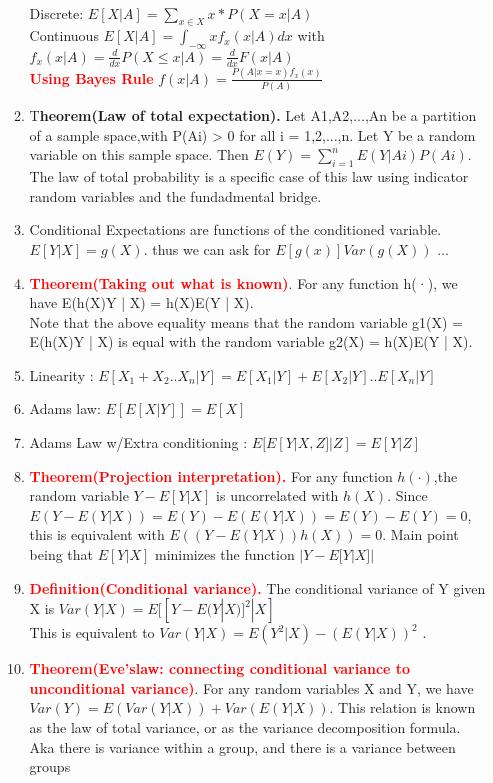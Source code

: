 \documentclass[11pt]{article}
\begin{document}
\begin{enumerate}
\begin{enumerate}
	\\
	Discrete: $E[X|A] = \sum_{x\in X} x*P(X=x|A)$\\
	Continuous $E[X|A] = \int_{-\infty}xf_x(x|A)dx$ with $f_x(x|A) = \frac{d}{dx} P(X\le x|A) = \frac{d}{dx} F(x|A)$
	\\
	\textcolor{red}{\textbf{Using Bayes Rule}}
	$f(x|A) = \frac{P(A|x=x)f_x(x)}{P(A)}$
	\item T\textbf{heorem(Law of total expectation). }Let A1,A2,...,An be a partition of a sample space,with P(Ai) > 0 for all i = 1,2,...,n. Let Y be a random variable on this sample space. Then $E(Y) = \sum_{i=1}^{n}E(Y | Ai)P(Ai). $
	\\
	The law of total probability is a specific case of this law using indicator random variables and the fundadmental bridge.
	\item Conditional Expectations are functions of the conditioned variable.\\
	$E[Y|X] = g(X)$. thus we can ask for $E[g(x)] Var(g(X)) $ ...
	\item \textcolor{red}{\textbf{Theorem(Taking out what is known)}}. For any function h(·), we have E(h(X)Y | X) = h(X)E(Y | X).\\
	Note that the above equality means that the random variable g1(X) = E(h(X)Y | X) is equal with the random variable g2(X) = h(X)E(Y | X). 
	\item Linearity : $E[X_1+X_2..X_n|Y] = E[X_1|Y] + E[X_2|Y] .. E[X_n|Y]$
	\item Adams law: $E[E[X|Y]] = E[X]$
	\item Adams Law w/Extra conditioning : $E[E[Y|X,Z]|Z] = E[Y|Z]$
	\item \textcolor{red}{\textbf{Theorem(Projection interpretation).}} For any function $h(·)$,the random variable $Y-E[Y|X]$ is uncorrelated with $h(X)$. Since $E(Y-E(Y|X)) = E(Y)-E(E(Y|X)) = E(Y)-E(Y) = 0$, this is equivalent with $E((Y-E(Y|X))h(X)) = 0$. Main point being that $E[Y|X]$ minimizes the function $|Y - E[Y|X]|$ 
	\item \textcolor{red}{\textbf{Definition(Conditional variance).}} The conditional variance of Y given X is $Var(Y | X) = E[[Y-E(Y|X)]^2|X]$
	\\
	This is equivalent to $Var(Y|X) = E(Y^2|X)-(E(Y|X))^2$ .
	\item \textcolor{red}{\textbf{Theorem(Eve’slaw: connecting conditional variance to unconditional variance)}}. For any random variables X and Y, we have $Var(Y) = E(Var(Y | X)) + Var(E(Y | X))$. This relation is known as the law of total variance, or as the variance decomposition formula.
	\\
	Aka there is variance within a group, and there is a variance between groups 
\end{enumerate}
\end{enumerate}
\end{document}
